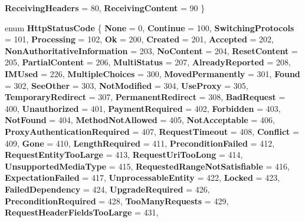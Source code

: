 \begin{DoxyCompactItemize}
{\bfseries Receiving\+Headers} = 80, 
{\bfseries Receiving\+Content} = 90
 \}
\item 
\mbox{\label{namespace_windows_1_1_web_1_1_http_a2378c3ed9d3b208a45e8b6dcc91ea4e4}} 
enum {\bfseries Http\+Status\+Code} \{ \newline
{\bfseries None} = 0, 
{\bfseries Continue} = 100, 
{\bfseries Switching\+Protocols} = 101, 
{\bfseries Processing} = 102, 
\newline
{\bfseries Ok} = 200, 
{\bfseries Created} = 201, 
{\bfseries Accepted} = 202, 
{\bfseries Non\+Authoritative\+Information} = 203, 
\newline
{\bfseries No\+Content} = 204, 
{\bfseries Reset\+Content} = 205, 
{\bfseries Partial\+Content} = 206, 
{\bfseries Multi\+Status} = 207, 
\newline
{\bfseries Already\+Reported} = 208, 
{\bfseries I\+M\+Used} = 226, 
{\bfseries Multiple\+Choices} = 300, 
{\bfseries Moved\+Permanently} = 301, 
\newline
{\bfseries Found} = 302, 
{\bfseries See\+Other} = 303, 
{\bfseries Not\+Modified} = 304, 
{\bfseries Use\+Proxy} = 305, 
\newline
{\bfseries Temporary\+Redirect} = 307, 
{\bfseries Permanent\+Redirect} = 308, 
{\bfseries Bad\+Request} = 400, 
{\bfseries Unauthorized} = 401, 
\newline
{\bfseries Payment\+Required} = 402, 
{\bfseries Forbidden} = 403, 
{\bfseries Not\+Found} = 404, 
{\bfseries Method\+Not\+Allowed} = 405, 
\newline
{\bfseries Not\+Acceptable} = 406, 
{\bfseries Proxy\+Authentication\+Required} = 407, 
{\bfseries Request\+Timeout} = 408, 
{\bfseries Conflict} = 409, 
\newline
{\bfseries Gone} = 410, 
{\bfseries Length\+Required} = 411, 
{\bfseries Precondition\+Failed} = 412, 
{\bfseries Request\+Entity\+Too\+Large} = 413, 
\newline
{\bfseries Request\+Uri\+Too\+Long} = 414, 
{\bfseries Unsupported\+Media\+Type} = 415, 
{\bfseries Requested\+Range\+Not\+Satisfiable} = 416, 
{\bfseries Expectation\+Failed} = 417, 
\newline
{\bfseries Unprocessable\+Entity} = 422, 
{\bfseries Locked} = 423, 
{\bfseries Failed\+Dependency} = 424, 
{\bfseries Upgrade\+Required} = 426, 
\newline
{\bfseries Precondition\+Required} = 428, 
{\bfseries Too\+Many\+Requests} = 429, 
{\bfseries Request\+Header\+Fields\+Too\+Large} = 431, 

\end{DoxyCompactItemize}
